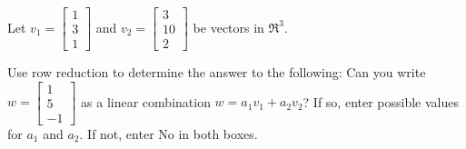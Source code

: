 




\endedxvertical









Let $v_1 = \left[\begin{array}{c} 1 \\ 3  \\ 1 \end{array} \right]$ and  
$v_2 = \left[\begin{array}{c} 3 \\ 10  \\ 2 \end{array} \right]$  be vectors in $\Re^3$.

Use row reduction to determine the answer to the following: 
Can you write $w = \left[\begin{array}{c} 1 \\ 5 \\ -1 \end{array} \right]$
as a linear combination $w = a_1 v_1 + a_2 v_2$?  If so, enter possible values for $a_1$ and
$a_2$.  If not, enter No in both boxes.  


\\
\\


